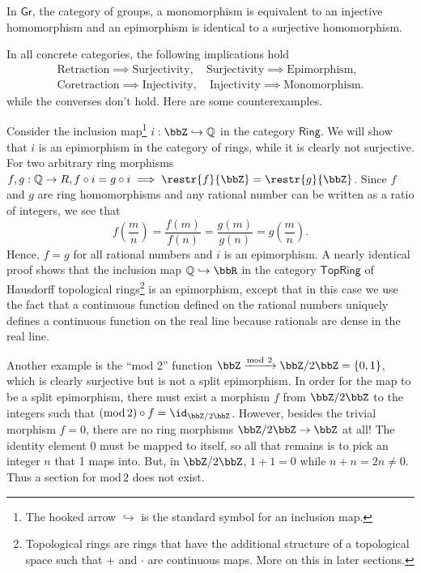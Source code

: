 %
\begin{prop}
    In $\mathsf{Gr}$, the category of groups, a monomorphism is equivalent
    to an injective homomorphism and an epimorphism is identical to a
    surjective homomorphism.
\end{prop}
In all concrete categories, the following implications hold 
\begin{gather}
    \text{Retraction}\implies\text{Surjectivity},\quad\text{Surjectivity}\implies\text{Epimorphism},\\
    \text{Coretraction}\implies\text{Injectivity},\quad\text{Injectivity}\implies\text{Monomorphism.}
\end{gather}
while the converses don't hold. Here are some counterexamples. 
\begin{example}
    Consider the inclusion map\footnote{The hooked arrow $\hookrightarrow$ is the standard symbol for an
    inclusion map.} $i:\bbZ\hookrightarrow\mathbb{Q}$ in the category $\mathsf{Ring}$.
    We will show that $i$ is an epimorphism in the category of rings,
    while it is clearly not surjective. For two arbitrary ring morphisms
    $f,g:\mathbb{Q}\rightarrow R,f\circ i=g\circ i\implies\restr{f}{\bbZ}=\restr{g}{\bbZ}$.
    Since $f$ and $g$ are ring homomorphisms and any rational number
    can be written as a ratio of integers, we see that 
    \begin{equation}
    f\left(\frac{m}{n}\right)=\frac{f(m)}{f(n)}=\frac{g(m)}{g(n)}=g\left(\frac{m}{n}\right).
    \end{equation}
    Hence, $f=g$ for all rational numbers and $i$ is an epimorphism.
    A nearly identical proof shows that the inclusion map $\mathbb{Q}\hookrightarrow\bbR $
    in the category $\mathsf{TopRing}$ of Hausdorff topological rings\footnote{Topological rings are rings that have the additional structure of
    a topological space such that $+$ and $\cdot$ are continuous maps.
    More on this in later sections.} is an epimorphism, except that in this case we use the fact that
    a continuous function defined on the rational numbers uniquely defines
    a continuous function on the real line because rationals are dense
    in the real line.
\end{example}
%
\begin{example}
    Another example is the ``mod 2'' function $\bbZ\xrightarrow{\text{mod}~2}\bbZ/2\bbZ=\{0,1\}$,
    which is clearly surjective but is not a split epimorphism. In order
    for the map to be a split epimorphism, there must exist a morphism
    $f$ from $\bbZ/2\bbZ$ to the integers such that $\left(\text{mod}\,2\right)\circ f=\id_{\bbZ/2\bbZ}$.
    However, besides the trivial morphism $f=0$, there are no ring morphisms
    $\bbZ/2\bbZ\to\bbZ$ at all! The identity element
    0 must be mapped to itself, so all that remains is to pick an integer
    $n$ that 1 maps into. But, in $\bbZ/2\bbZ$, $1+1=0$
    while $n+n=2n\ne0$. Thus a section for $\text{mod}\,2$ does not exist.
\end{example}
